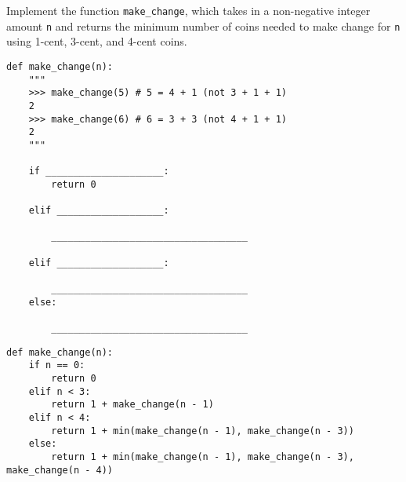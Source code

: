 \begin{blocksection}
\question 
Implement the function \lstinline{make_change}, which takes in a non-negative integer amount \lstinline{n} and returns the minimum number of coins needed to make change for \lstinline{n} using 1-cent, 3-cent, and 4-cent coins.

\begin{lstlisting}
def make_change(n):
    """
    >>> make_change(5) # 5 = 4 + 1 (not 3 + 1 + 1)
    2
    >>> make_change(6) # 6 = 3 + 3 (not 4 + 1 + 1)
    2
    """

    if _____________________:
        return 0

    elif ___________________:

        ___________________________________

    elif ___________________:

        ___________________________________
    else:

        ___________________________________
\end{lstlisting}
\end{blocksection}

\begin{blocksection}
\begin{solution}
\begin{lstlisting}
def make_change(n):
    if n == 0:
        return 0
    elif n < 3:
        return 1 + make_change(n - 1)
    elif n < 4:
        return 1 + min(make_change(n - 1), make_change(n - 3))
    else:
        return 1 + min(make_change(n - 1), make_change(n - 3), make_change(n - 4))
\end{lstlisting}
\end{solution}
\end{blocksection}
